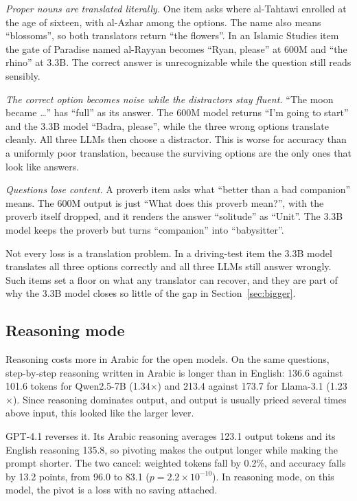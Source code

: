 \documentclass[conference,a4paper]{IEEEtran}
\begin{document}
\textit{Proper nouns are translated literally.} One item asks where al-Tahtawi
enrolled at the age of sixteen, with al-Azhar among the options. The name also
means ``blossoms'', so both translators return ``the flowers''. In an Islamic
Studies item the gate of Paradise named al-Rayyan becomes ``Ryan, please'' at
600M and ``the rhino'' at 3.3B. The correct answer is unrecognizable while the
question still reads sensibly.

\textit{The correct option becomes noise while the distractors stay fluent.}
``The moon became \dots'' has ``full'' as its answer. The 600M model returns
``I'm going to start'' and the 3.3B model ``Badra, please'', while the three
wrong options translate cleanly. All three LLMs then choose a distractor. This
is worse for accuracy than a uniformly poor translation, because the surviving
options are the only ones that look like answers.

\textit{Questions lose content.} A proverb item asks what ``better than a bad
companion'' means. The 600M output is just ``What does this proverb mean?'',
with the proverb itself dropped, and it renders the answer ``solitude'' as
``Unit''. The 3.3B model keeps the proverb but turns ``companion'' into
``babysitter''.

Not every loss is a translation problem. In a driving-test item the 3.3B model
translates all three options correctly and all three LLMs still answer wrongly.
Such items set a floor on what any translator can recover, and they are part of
why the 3.3B model closes so little of the gap in Section~\ref{sec:bigger}.

\subsection{Reasoning mode}
\label{sec:reasoning}

Reasoning costs more in Arabic for the open models. On the same questions,
step-by-step reasoning written in Arabic is longer than in English: 136.6
against 101.6 tokens for Qwen2.5-7B (1.34$\times$) and 213.4 against 173.7 for
Llama-3.1 (1.23$\times$). Since reasoning dominates output, and output is
usually priced several times above input, this looked like the larger lever.

GPT-4.1 reverses it. Its Arabic reasoning averages 123.1 output tokens and its
English reasoning 135.8, so pivoting makes the output longer while making the
prompt shorter. The two cancel: weighted tokens fall by 0.2\%, and accuracy
falls by 13.2 points, from 96.0 to 83.1 ($p = 2.2 \times 10^{-10}$). In
reasoning mode, on this model, the pivot is a loss with no saving attached.
\end{document}
